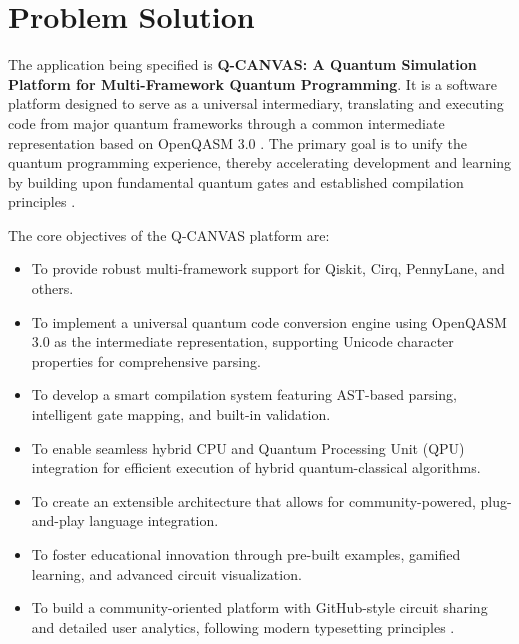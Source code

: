 \section{Problem Solution}
The application being specified is \textbf{Q-CANVAS: A Quantum Simulation Platform for Multi-Framework Quantum Programming}. It is a software platform designed to serve as a universal intermediary, translating and executing code from major quantum frameworks through a common intermediate representation based on OpenQASM 3.0 \cite{mckay2018}. The primary goal is to unify the quantum programming experience, thereby accelerating development and learning by building upon fundamental quantum gates \cite{barenco1995} and established compilation principles \cite{wilkes1989}.

The core objectives of the Q-CANVAS platform are:
\begin{itemize}
    \item To provide robust multi-framework support for Qiskit, Cirq, PennyLane, and others.
    \item To implement a universal quantum code conversion engine using OpenQASM 3.0 as the intermediate representation, supporting Unicode character properties \cite{wikipedia2022} for comprehensive parsing.
    \item To develop a smart compilation system featuring AST-based parsing, intelligent gate mapping, and built-in validation.
    \item To enable seamless hybrid CPU and Quantum Processing Unit (QPU) integration for efficient execution of hybrid quantum-classical algorithms.
    \item To create an extensible architecture that allows for community-powered, plug-and-play language integration.
    \item To foster educational innovation through pre-built examples, gamified learning, and advanced circuit visualization.
    \item To build a community-oriented platform with GitHub-style circuit sharing and detailed user analytics, following modern typesetting principles \cite{knuth1984}.
\end{itemize}

